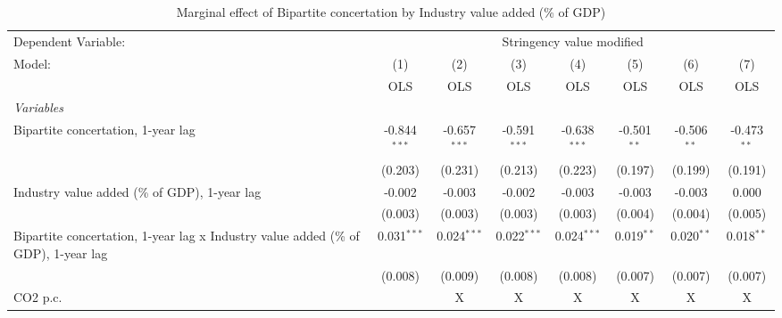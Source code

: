 
\begin{table}[htbp]
   \caption{Marginal effect of Bipartite concertation by Industry value added (\% of GDP)}
   \centering
   \begin{tabular}{lccccccc}
      \toprule
      Dependent Variable: & \multicolumn{7}{c}{Stringency value modified}\\
      Model:                                                                             & (1)            & (2)            & (3)            & (4)            & (5)           & (6)           & (7)\\  
                                                                                         &  OLS           & OLS            & OLS            & OLS            & OLS           & OLS           & OLS\\  
      \midrule
      \emph{Variables}\\
      Bipartite concertation, 1-year lag                                                 & -0.844$^{***}$ & -0.657$^{***}$ & -0.591$^{***}$ & -0.638$^{***}$ & -0.501$^{**}$ & -0.506$^{**}$ & -0.473$^{**}$\\   
                                                                                         & (0.203)        & (0.231)        & (0.213)        & (0.223)        & (0.197)       & (0.199)       & (0.191)\\   
      Industry value added (\% of GDP), 1-year lag                                       & -0.002         & -0.003         & -0.002         & -0.003         & -0.003        & -0.003        & 0.000\\   
                                                                                         & (0.003)        & (0.003)        & (0.003)        & (0.003)        & (0.004)       & (0.004)       & (0.005)\\   
      Bipartite concertation, 1-year lag x Industry value added (\% of GDP), 1-year lag  & 0.031$^{***}$  & 0.024$^{***}$  & 0.022$^{***}$  & 0.024$^{***}$  & 0.019$^{**}$  & 0.020$^{**}$  & 0.018$^{**}$\\   
                                                                                         & (0.008)        & (0.009)        & (0.008)        & (0.008)        & (0.007)       & (0.007)       & (0.007)\\   
      CO2 p.c.                                                                           &                & X              & X              & X              & X             & X             & X\\  

\end{tabular}
\end{table}
